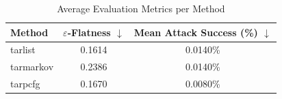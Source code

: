\begin{table}[h]
\centering
\caption{Average Evaluation Metrics per Method}
\label{tab:honeyword-metrics}
\begin{tabular}{lcc}
\hline
Method & $\varepsilon$-Flatness $\downarrow$ & Mean Attack Success (\%) $\downarrow$ \\
\hline
  tarlist & 0.1614 & 0.0140\% \\
  tarmarkov & 0.2386 & 0.0140\% \\
  tarpcfg & 0.1670 & 0.0080\% \\
\hline
\end{tabular}
\end{table}